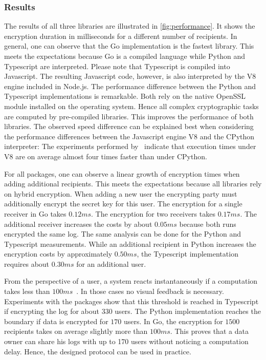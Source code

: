 \documentclass[../main.tex]{subfiles}
\begin{document}
\subsubsection{Results}
The results of all three libraries are illustrated in \cref{fig:performance}.
It shows the encryption duration in milliseconds for a different number of recipients.
In general, one can observe that the Go implementation is the fastest library.
This meets the expectations because Go is a compiled language while Python and Typescript are interpreted.
Please note that Typescript is compiled into Javascript.
The resulting Javascript code, however, is also interpreted by the V8 engine included in Node.js.
The performance difference between the Python and Typescript implementations is remarkable.
Both rely on the native OpenSSL module installed on the operating system.
Hence all complex cryptographic tasks are computed by pre-compiled libraries.
This improves the performance of both libraries.
The observed speed difference can be explained best when considering the performance differences between the Javascript engine V8 and the CPython interpreter:
The experiments performed by~\cite{Lion2022} indicate that execution times under V8 are on average almost four times faster than under CPython.

For all packages, one can observe a linear growth of encryption times when adding additional recipients.
This meets the expectations because all libraries rely on hybrid encryption.
When adding a new user the encrypting party must additionally encrypt the secret key for this user.
The encryption for a single receiver in Go takes $0.12ms$.
The encryption for two receivers takes $0.17ms$.
The additional receiver increases the costs by about $0.05ms$ because both runs encrypted the same log.
The same analysis can be done for the Python and Typescript measurements.
While an additional recipient in Python increases the encryption costs by approximately $0.50ms$, the Typescript implementation requires about $0.30ms$ for an additional user.

From the perspective of a user, a system reacts instantaneously if a computation takes less than $100ms$~\cite{Nielson1993}.
In those cases no visual feedback is necessary.
Experiments with the packages show that this threshold is reached in Typescript if encrypting the log for about $330$ users.
The Python implementation reaches the boundary if data is encrypted for $170$ users.
In Go, the encryption for $1500$ recipients takes on average slightly more than $100ms$.
This proves that a data owner can share his logs with up to 170 users without noticing a computation delay.
Hence, the designed protocol can be used in practice.
\end{document}
